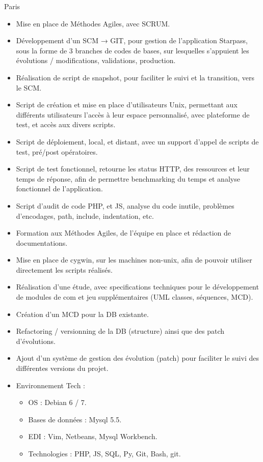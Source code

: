 \documentclass[10pt,a4paper,sans]{moderncv}
\begin{document}
{Paris}{
    \begin{itemize}%
        \item Mise en place de Méthodes Agiles, avec SCRUM.
        \item Développement d'un SCM → GIT, pour gestion de l'application Starpass, sous la forme de 3 branches de codes de bases, sur lesquelles s'appuient les évolutions / modifications, validations, production.
        \item Réalisation de script de snapshot, pour faciliter le suivi et la transition, vers le SCM.
        \item Script de création et mise en place d'utilisateurs Unix, permettant aux différents utilisateurs l'accès à leur espace personnalisé, avec plateforme de test, et accès aux divers scripts.
        \item Script de déploiement, local, et distant, avec un support d'appel de scripts de test, pré/post opératoires.
        \item Script de test fonctionnel, retourne les status HTTP, des ressources et leur temps de réponse, afin de permettre benchmarking du temps et analyse fonctionnel de l'application.
        \item Script d'audit de code PHP, et JS, analyse du code inutile, problèmes d'encodages, path, include, indentation, etc.
        \item Formation aux Méthodes Agiles, de l'équipe en place et rédaction de documentations.
        \item Mise en place de cygwin, sur les machines non-unix, afin de pouvoir utiliser directement les scripts réalisés.
        \item Réalisation d'une étude, avec specifications techniques pour le développement de modules de com et jeu supplémentaires (UML classes, séquences, MCD).
        \item Création d'un MCD pour la DB existante.
        \item Refactoring / versionning de la DB (structure) ainsi que des patch d'évolutions.
        \item Ajout d'un système de gestion des évolution (patch) pour faciliter le suivi des différentes versions du projet.
        \item Environnement Tech :
            \begin{itemize}%
                \item OS : Debian 6 / 7.
                \item Bases de données : Mysql 5.5.
                \item EDI : Vim, Netbeans, Mysql Workbench.
                \item Technologies : PHP, JS, SQL, Py, Git, Bash, git.
            \end{itemize}
\end{itemize}}
\end{document}
